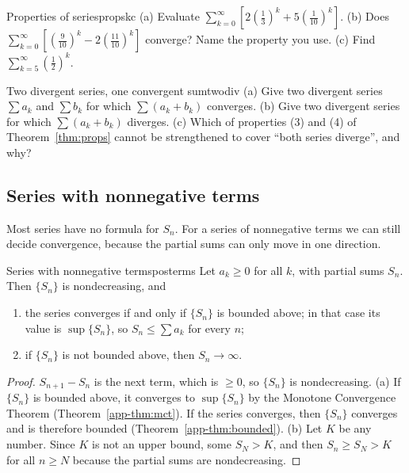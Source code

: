 \documentclass[11pt]{article}
\begin{document}
\begin{kc}{Properties of series}{propskc}
(a) Evaluate $\displaystyle\sum_{k=0}^\infty\left[2\left(\frac13\right)^k+5\left(\frac1{10}\right)^k\right]$. (b) Does $\displaystyle\sum_{k=0}^\infty\left[\left(\frac9{10}\right)^k-2\left(\frac{11}{10}\right)^k\right]$ converge? Name the property you use. (c) Find $\displaystyle\sum_{k=5}^\infty\left(\frac12\right)^k$.
\end{kc}

\begin{think}{Two divergent series, one convergent sum}{twodiv}
(a) Give two divergent series $\sum a_k$ and $\sum b_k$ for which $\sum(a_k+b_k)$ converges. (b) Give two divergent series for which $\sum(a_k+b_k)$ diverges. (c) Which of properties (3) and (4) of Theorem~\ref{thm:props} cannot be strengthened to cover ``both series diverge'', and why?
\end{think}

\subsection*{Series with nonnegative terms}

Most series have no formula for $S_n$. For a series of nonnegative terms we can still decide convergence, because the partial sums can only move in one direction.

\begin{thm}{Series with nonnegative terms}{posterms}
Let $a_k\ge0$ for all $k$, with partial sums $S_n$. Then $\{S_n\}$ is nondecreasing, and
\begin{enumerate}[label=(\alph*)]
  \item the series converges if and only if $\{S_n\}$ is bounded above; in that case its value is $\sup\{S_n\}$, so $S_n\le\sum a_k$ for every $n$;
  \item if $\{S_n\}$ is not bounded above, then $S_n\to\infty$.
\end{enumerate}
\end{thm}
\begin{proof}
$S_{n+1}-S_n$ is the next term, which is $\ge0$, so $\{S_n\}$ is nondecreasing. (a) If $\{S_n\}$ is bounded above, it converges to $\sup\{S_n\}$ by the Monotone Convergence Theorem (Theorem~\ref{app-thm:mct}). If the series converges, then $\{S_n\}$ converges and is therefore bounded (Theorem~\ref{app-thm:bounded}). (b) Let $K$ be any number. Since $K$ is not an upper bound, some $S_N>K$, and then $S_n\ge S_N>K$ for all $n\ge N$ because the partial sums are nondecreasing.
\end{proof}
\end{document}
